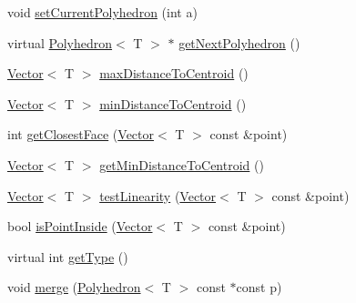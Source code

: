 \begin{DoxyCompactItemize}
void \hyperlink{classccmc_1_1_polyhedron_a140b9776d318b32baeb43f807f8b6791}{set\-Current\-Polyhedron} (int a)
\item 
virtual \hyperlink{classccmc_1_1_polyhedron}{Polyhedron}$<$ T $>$ $\ast$ \hyperlink{classccmc_1_1_polyhedron_a3a3d6e72e95b7e7829149f3fa59f57f6}{get\-Next\-Polyhedron} ()
\item 
\hyperlink{classccmc_1_1_vector}{Vector}$<$ T $>$ \hyperlink{classccmc_1_1_polyhedron_ac7c3d855a8df0072cc23c88a42f8bd78}{max\-Distance\-To\-Centroid} ()
\item 
\hyperlink{classccmc_1_1_vector}{Vector}$<$ T $>$ \hyperlink{classccmc_1_1_polyhedron_ac6c4696d8599d39da7dca7ecb6008ba7}{min\-Distance\-To\-Centroid} ()
\item 
int \hyperlink{classccmc_1_1_polyhedron_afd4793a541b3638e10ad230b9edc101c}{get\-Closest\-Face} (\hyperlink{classccmc_1_1_vector}{Vector}$<$ T $>$ const \&point)
\item 
\hyperlink{classccmc_1_1_vector}{Vector}$<$ T $>$ \hyperlink{classccmc_1_1_polyhedron_ab68fb11d2cbbd0a9bc81ce4c4a7279b1}{get\-Min\-Distance\-To\-Centroid} ()
\item 
\hyperlink{classccmc_1_1_vector}{Vector}$<$ T $>$ \hyperlink{classccmc_1_1_polyhedron_a4630616f4eb7d32a53e1a23a332db78c}{test\-Linearity} (\hyperlink{classccmc_1_1_vector}{Vector}$<$ T $>$ const \&point)
\item 
bool \hyperlink{classccmc_1_1_polyhedron_ab49d000c95f4e79132727103524ca45b}{is\-Point\-Inside} (\hyperlink{classccmc_1_1_vector}{Vector}$<$ T $>$ const \&point)
\item 
virtual int \hyperlink{classccmc_1_1_polyhedron_abef63d69bf96e4bacb000546631a048e}{get\-Type} ()
\item 
void \hyperlink{classccmc_1_1_polyhedron_a01b4863ead9a3136aec465067132afcc}{merge} (\hyperlink{classccmc_1_1_polyhedron}{Polyhedron}$<$ T $>$ const $\ast$const p)
\end{DoxyCompactItemize}
